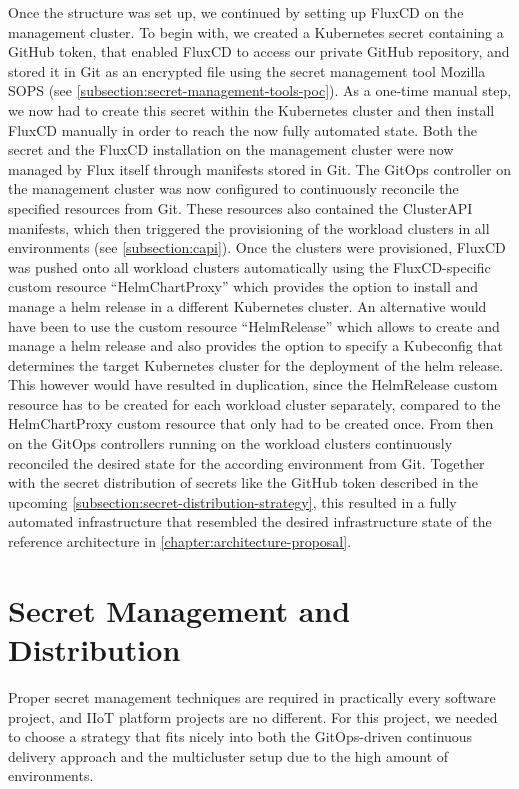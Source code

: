         Once the structure was set up, we continued by setting up FluxCD on the management cluster. To begin with, we created a Kubernetes secret containing a GitHub token, that enabled FluxCD to access our private GitHub repository, and stored it in Git as an encrypted file using the secret management tool Mozilla SOPS (see \autoref{subsection:secret-management-tools-poc}). As a one-time manual step, we now had to create this secret within the Kubernetes cluster and then install FluxCD manually in order to reach the now fully automated state. Both the secret and the FluxCD installation on the management cluster were now managed by Flux itself through manifests stored in Git. The GitOps controller on the management cluster was now configured to continuously reconcile the specified resources from Git. These resources also contained the ClusterAPI manifests, which then triggered the provisioning of the workload clusters in all environments (see \autoref{subsection:capi}). Once the clusters were provisioned, FluxCD was pushed onto all workload clusters automatically using the FluxCD-specific custom resource ``HelmChartProxy'' which provides the option to install and manage a helm release in a different Kubernetes cluster. An alternative would have been to use the custom resource ``HelmRelease'' which allows to create and manage a helm release and also provides the option to specify a Kubeconfig that determines the target Kubernetes cluster for the deployment of the helm release. This however would have resulted in duplication, since the HelmRelease custom resource has to be created for each workload cluster separately, compared to the HelmChartProxy custom resource that only had to be created once. From then on the GitOps controllers running on the workload clusters continuously reconciled the desired state for the according environment from Git. Together with the secret distribution of secrets like the GitHub token described in the upcoming \autoref{subsection:secret-distribution-strategy}, this resulted in a fully automated infrastructure that resembled the desired infrastructure state of the reference architecture in \autoref{chapter:architecture-proposal}.
        
    \section{Secret Management and Distribution}

        Proper secret management techniques are required in practically every software project, and IIoT platform projects are no different. For this project, we needed to choose a strategy that fits nicely into both the GitOps-driven continuous delivery approach and the multicluster setup due to the high amount of environments. 

